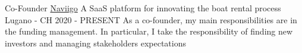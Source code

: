 
\begin{cventries}
  \cventry
    {Co-Founder} %
    {\href{https://www.naviigo.com}{Naviigo}} %
    {A SaaS platform for innovating the boat rental process}
    {Lugano - CH} %
    {2020 -  PRESENT} %
    {
      As a co-founder, my main responsibilities are in the funding management. In particular, I take the responsibility of finding new investors and managing stakeholders expectations
    }
\end{cventries}